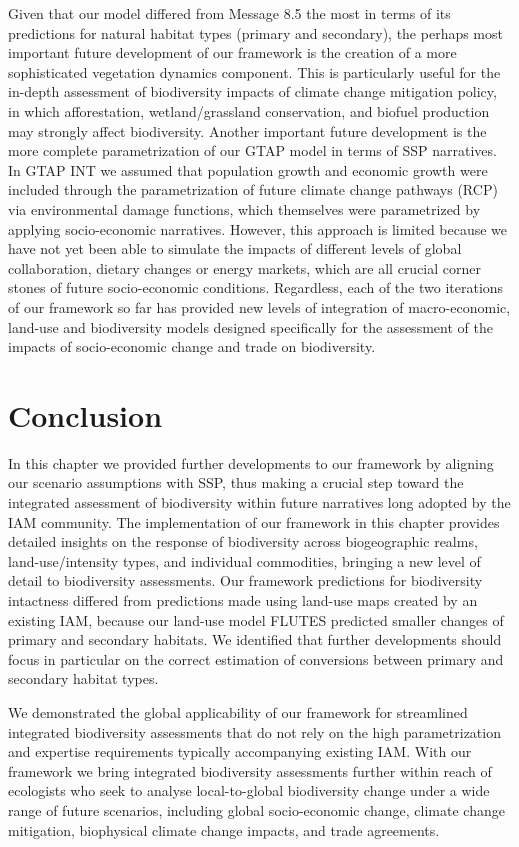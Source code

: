 \documentclass[titlesmallcaps,copyrightpage]{uomthesis}\usepackage[]{graphicx}\usepackage[]{color}
\begin{document}
Given that our model differed from Message 8.5 the most in terms of its predictions for natural habitat types (primary and secondary), the perhaps most important future development of our framework is the creation of a more sophisticated vegetation dynamics component. This is particularly useful for the in-depth assessment of biodiversity impacts of climate change mitigation policy, in which afforestation, wetland/grassland conservation, and biofuel production may strongly affect biodiversity. Another important future development is the more complete parametrization of our GTAP model in terms of SSP narratives. In GTAP INT we assumed that population growth and economic growth were included through the parametrization of future climate change pathways (RCP) via environmental damage functions, which themselves were parametrized by applying socio-economic narratives. However, this approach is limited because we have not yet been able to simulate the impacts of different levels of global collaboration, dietary changes or energy markets, which are all crucial corner stones of future socio-economic conditions. Regardless, each of the two iterations of our framework so far has provided new levels of integration of macro-economic, land-use and biodiversity models designed specifically for the assessment of the impacts of socio-economic change and trade on biodiversity.

\section{Conclusion}
In this chapter we provided further developments to our framework by aligning our scenario assumptions with SSP, thus making a crucial step toward the integrated assessment of biodiversity within future narratives long adopted by the IAM community. The implementation of our framework in this chapter provides detailed insights on the response of biodiversity across biogeographic realms, land-use/intensity types, and individual commodities, bringing a new level of detail to biodiversity assessments. Our framework predictions for biodiversity intactness differed from predictions made using land-use maps created by an existing IAM, because our land-use model FLUTES predicted smaller changes of primary and secondary habitats. We identified that further developments should focus in particular on the correct estimation of conversions between primary and secondary habitat types. 

We demonstrated the global applicability of our framework for streamlined integrated biodiversity assessments that do not rely on the high parametrization and expertise requirements typically accompanying existing IAM. With our framework we bring integrated biodiversity assessments further within reach of ecologists who seek to analyse local-to-global biodiversity change under a wide range of future scenarios, including global socio-economic change, climate change mitigation, biophysical climate change impacts, and trade agreements.
\end{document}
